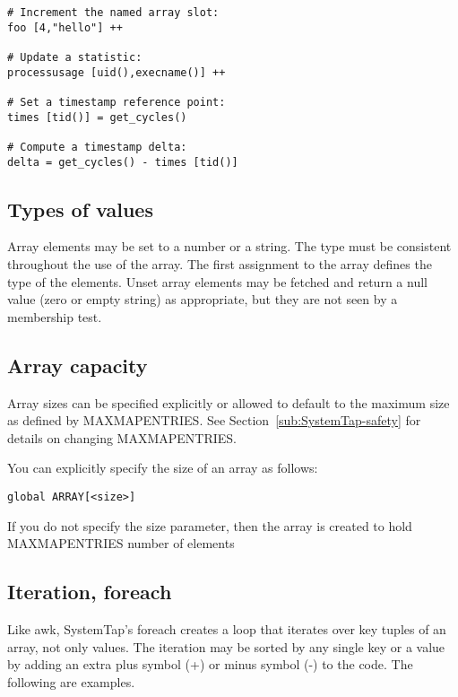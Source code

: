 \documentclass[twoside,english]{article}
\newenvironment{vindent}
{\begin{list}{}{\setlength{\listparindent}{6pt}}
\item[]}
{\end{list}}
\begin{document}
\begin{vindent}
\begin{verbatim}
# Increment the named array slot:
foo [4,"hello"] ++

# Update a statistic:
processusage [uid(),execname()] ++

# Set a timestamp reference point:
times [tid()] = get_cycles()

# Compute a timestamp delta:
delta = get_cycles() - times [tid()]
\end{verbatim}
\end{vindent}

\subsection{Types of values}

Array elements may be set to a number or a string. The type must be consistent
throughout the use of the array. The first assignment to the array defines
the type of the elements. Unset array elements may be fetched and return
a null value (zero or empty string) as appropriate, but they are not seen
by a membership test.


\subsection{Array capacity}

Array sizes can be specified explicitly or allowed to default to the maximum
size as defined by MAXMAPENTRIES. See Section~\ref{sub:SystemTap-safety}
for details on changing MAXMAPENTRIES.

You can explicitly specify the size of an array as follows:

\begin{vindent}
\begin{verbatim}
global ARRAY[<size>]
\end{verbatim}
\end{vindent}
If you do not specify the size parameter, then the array is created to hold
MAXMAPENTRIES number of elements


\subsection{Iteration, foreach}
Like awk, SystemTap's foreach creates a loop that iterates over key tuples
of an array, not only values. The iteration may be sorted by any single key
or a value by adding an extra plus symbol (+) or minus symbol (-) to the
code. The following are examples.
\end{document}
